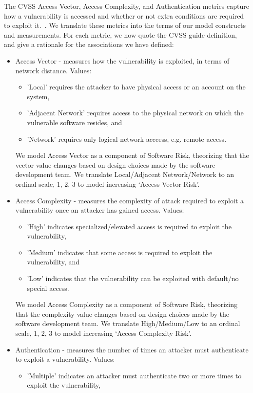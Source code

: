 The CVSS Access Vector, Access Complexity, and Authentication metrics capture how a vulnerability is accessed and whether or not extra conditions are required to exploit it.~\cite{mell2007complete}. We translate these metrics into the terms of our model constructs and measurements. For each metric, we now quote the CVSS guide definition, and give a rationale for the associations we have defined:
\begin{itemize}
	\item Access Vector - measures how the vulnerability is exploited, in terms of network distance. Values:
	\begin{itemize}
		\item 'Local' requires the attacker to have physical access or an account on the system, \item 'Adjacent Network' requires access to the physical network on which the vulnerable software resides, and \item 'Network' requires only logical network acccess, e.g. remote access. 
	\end{itemize}
	We model Access Vector as a component of Software Risk, theorizing that the vector value changes based on design choices made by the software development team. We translate Local/Adjacent Network/Network to an ordinal scale, 1, 2, 3 to model increasing `Access Vector Risk'.
	\item Access Complexity - measures the complexity of attack required to exploit a vulnerability once an attacker has gained access. Values: 
	\begin{itemize}
		\item 'High' indicates specialized/elevated access is required to exploit the vulnerability, 
		\item 'Medium' indicates that some access is required to exploit the vulnerability, and \item 'Low' indicates that the vulnerability can be exploited with default/no special access.  
	\end{itemize}
	We model Access Complexity as a component of Software Risk, theorizing that the complexity value changes based on design choices made by the software development team. We translate High/Medium/Low to an ordinal scale, 1, 2, 3 to model increasing `Access Complexity Risk'.
	\item Authentication - measures the number of times an attacker must authenticate to exploit a vulnerability. Values: 
	\begin{itemize}
		\item 'Multiple' indicates an attacker must authenticate two or more times to exploit the vulnerability, 

\end{itemize}
\end{itemize}
